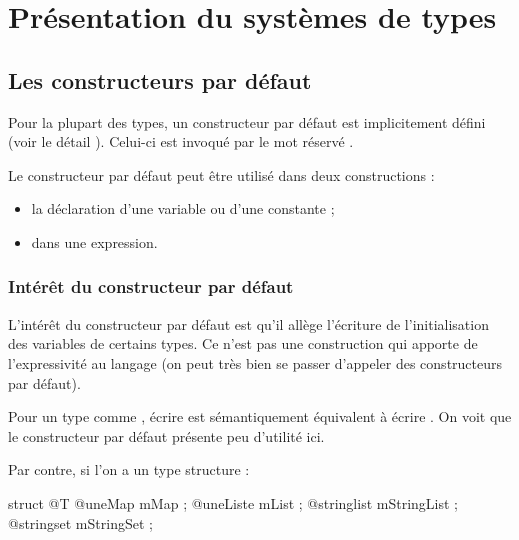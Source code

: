 
\chapter{Présentation du systèmes de types}















\section{Les constructeurs par défaut}

Pour la plupart des types, un constructeur par défaut est implicitement défini (voir le détail ). Celui-ci est invoqué par le mot réservé .

Le constructeur par défaut peut être utilisé dans deux constructions :
\begin{itemize}
  \item la déclaration d'une variable ou d'une constante ;
  \item dans une expression.
\end{itemize}

\subsection{Intérêt du constructeur par défaut}


L'intérêt du constructeur par défaut est qu'il allège l'écriture de l'initialisation des variables de certains types. Ce n'est pas une construction qui apporte de l'expressivité au langage (on peut très bien se passer d'appeler des constructeurs par défaut).

Pour un type comme , écrire  est sémantiquement équivalent à écrire . On voit que le constructeur par défaut présente peu d'utilité ici.

Par contre, si l'on a un type structure :

\begin{galgascode}
struct @T {
  @uneMap mMap ;
  @uneListe mList ;
  @stringlist mStringList ;
  @stringset mStringSet ;
}
\end{galgascode}


